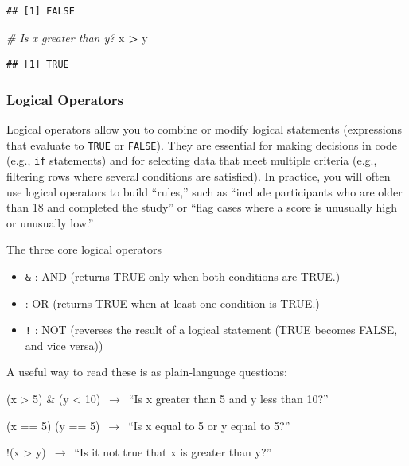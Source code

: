 \documentclass[
  11pt,
]{article}
\newenvironment{Shaded}{\begin{snugshade}}{\end{snugshade}}
\newcommand{\CommentTok}[1]{\textcolor[rgb]{0.56,0.35,0.01}{\textit{#1}}}
\newcommand{\NormalTok}[1]{#1}
\newcommand{\SpecialCharTok}[1]{\textcolor[rgb]{0.81,0.36,0.00}{\textbf{#1}}}
\providecommand{\tightlist}{%
  \setlength{\itemsep}{0pt}\setlength{\parskip}{0pt}}
\begin{document}
\begin{verbatim}
## [1] FALSE
\end{verbatim}

\begin{Shaded}
\begin{Highlighting}[]
\CommentTok{\# Is x greater than y?}
\NormalTok{x }\SpecialCharTok{\textgreater{}}\NormalTok{ y}
\end{Highlighting}
\end{Shaded}

\begin{verbatim}
## [1] TRUE
\end{verbatim}

\subsubsection{Logical Operators}\label{logical-operators}

Logical operators allow you to combine or modify logical statements
(expressions that evaluate to \texttt{TRUE} or \texttt{FALSE}). They are
essential for making decisions in code (e.g., \texttt{if} statements)
and for selecting data that meet multiple criteria (e.g., filtering rows
where several conditions are satisfied). In practice, you will often use
logical operators to build ``rules,'' such as ``include participants who
are older than 18 and completed the study'' or ``flag cases where a
score is unusually high or unusually low.''

The three core logical operators

\begin{itemize}
\tightlist
\item
  \texttt{\&} : AND (returns TRUE only when both conditions are TRUE.)
\item
  \texttt{\textbar{}} : OR (returns TRUE when at least one condition is
  TRUE.)
\item
  \texttt{!} : NOT (reverses the result of a logical statement (TRUE
  becomes FALSE, and vice versa))
\end{itemize}

A useful way to read these is as plain-language questions:

(x \textgreater{} 5) \& (y \textless{} 10) \(\,\longrightarrow\,\) ``Is
x greater than 5 and y less than 10?''

(x == 5) \textbar{} (y == 5) \(\,\longrightarrow\,\) ``Is x equal to 5
or y equal to 5?''

!(x \textgreater{} y) \(\,\longrightarrow\,\) ``Is it not true that x is
greater than y?''
\end{document}
